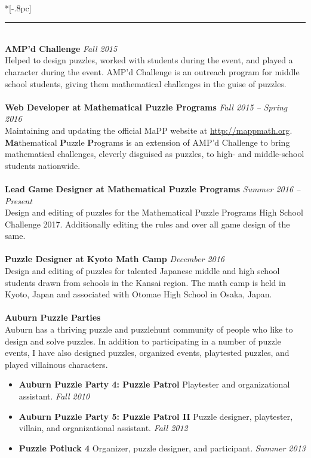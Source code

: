 \documentclass{article}
\begin{document}
 \\*[-.8pc]
\rule{\textwidth}{.1pt} \\
\textbf{AMP'd Challenge} \hfill \textit{Fall 2015}\\
Helped to design puzzles, worked with students during the event, and played a
character during the event. AMP'd Challenge is an outreach program for middle
school students, giving them
mathematical challenges in the guise of puzzles.  \\
\\
\textbf{Web Developer at Mathematical Puzzle Programs} \hfill \textit{Fall 2015
  -- Spring 2016}\\
Maintaining and updating the official MaPP website at
\url{http://mappmath.org}. \textbf{Ma}thematical \textbf{P}uzzle
\textbf{P}rograms is an extension of AMP'd Challenge to bring mathematical
challenges, cleverly
disguised as puzzles, to high- and middle-school students nationwide.\\
\\
\textbf{Lead Game Designer at Mathematical Puzzle Programs} \hfill
\textit{Summer 2016 -- Present}\\
Design and editing of puzzles for the Mathematical Puzzle Programs High School
Challenge 2017. Additionally editing the rules and over all game design of the
same. \\
\\
\textbf{Puzzle Designer at Kyoto Math Camp} \hfill \textit{December 2016}\\
Design and editing of puzzles for talented Japanese middle and high school
students drawn from schools in the Kansai region. The math camp is held in
Kyoto, Japan and associated with Otomae High School in Osaka, Japan.\\
\\
\textbf{Auburn Puzzle Parties}\\
Auburn has a thriving puzzle and puzzlehunt community of people who like to
design and solve puzzles. In addition to participating in a number of puzzle
events, I have also designed puzzles, organized events, playtested puzzles, and
played villainous characters.
\begin{itemize}[noitemsep]
\item \textbf{Auburn Puzzle Party 4: Puzzle Patrol} Playtester and
  organizational assistant. \hfill \textit{Fall 2010}
\item \textbf{Auburn Puzzle Party 5: Puzzle Patrol II} Puzzle designer,
  playtester, villain, and organizational assistant. \hfill \textit{Fall 2012}
\item \textbf{Puzzle Potluck 4} Organizer, puzzle designer, and
  participant. \hfill \textit{Summer 2013}
\end{itemize}
\end{document}
